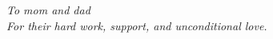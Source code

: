 \providecommand{\main}{..}



\begin{dedication}
	\vspace*{1in}
	\begin{center}
	         \emph{To mom and dad} \\
             \emph{For their hard work, support, and unconditional love.}
	\end{center}
\end{dedication}

